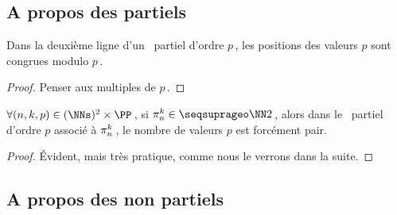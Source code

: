 

\subsection{A propos des \sftab[x] partiels} \label{sftable-constraint}


\begin{fact} \label{sftable-multiple}

	Dans la deuxième ligne d'un \sftab\ partiel d'ordre $p$\,, les positions des valeurs $p$ sont congrues modulo $p$\,.
\end{fact}


\begin{proof}
	Penser aux multiples de $p$\,.
\end{proof}




\begin{fact} \label{sftable-parity-square}
	$\forall (n, k, p) \in ( \NNs )^2 \times \PP$\,,
	si $\consprod \in \NNsquare$\,,
	alors dans le \sftab\ partiel d'ordre $p$ associé à $\consprod$\,, le nombre de valeurs $p$ est forcément pair.
\end{fact}


\begin{proof}
	Évident, mais très pratique, comme nous le verrons dans la suite.
\end{proof}




\subsection{A propos des \sftab[x] non partiels} \label{sftab-illegal}


